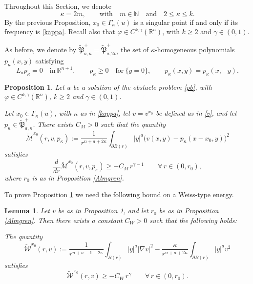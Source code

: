 \documentclass[11pt]{amsart}
\theoremstyle{plain}
\newtheorem{lemma}[thrm]{Lemma}
\newtheorem{prop}[thrm]{Proposition}
\numberwithin{equation}{section}
\begin{document}
Throughout this Section, we denote
\begin{equation}\label{kappa}
\kappa=2m,\qquad \textrm{with}\quad m\in \mathbb N \quad \textrm{and}\quad 2\leq \kappa\leq k.
\end{equation}
By the previous Proposition, $x_0\in\Gamma_\kappa(u)$ is a singular point if and only if its frequency is \eqref{kappa}.
Recall also that $\varphi\in C^{k,\gamma}({\mathbb R}^n)$, with $k\geq2$ and $\gamma\in(0,1)$.

As before, we denote by $\tilde{\mathfrak P}_{a,\kappa}^+=\tilde{\mathfrak P}_{a,2m}^+$ the set of $\kappa$-homogeneous polynomials $p_\kappa(x,y)$ satisfying
\[L_ap_\kappa=0\quad \textrm{in}\ {\mathbb R}^{n+1},\qquad p_\kappa\geq0\quad \textrm{for}\ \{y=0\},\qquad p_\kappa(x,y)=p_\kappa(x,-y).\]

\begin{prop}\label{monneau}
Let $u$ be a solution of the obstacle problem \eqref{pb}, with $\varphi\in C^{k,\gamma}({\mathbb R}^n)$,  $k\geq2$ and $\gamma\in(0,1)$.

Let $x_0\in \Gamma_\kappa(u)$, with $\kappa$ as in \eqref{kappa}, let $v=v^{x_0}$ be defined as in \eqref{v}, and let $p_\kappa\in \tilde{\mathfrak P}_{a,\kappa}^+$.
There exists $C_M>0$ such that the quantity
\[\tilde{\mathcal{M}}^{x_0}(r,v, p_\kappa):=\frac{1}{r^{n+a+2\kappa}}\int_{\partial {B(r)}}|y|^{a}\bigl(v(x,y)-p_\kappa(x-x_0,y)\bigr)^2\]
satisfies
\[\frac{d}{dr}\tilde{\mathcal{M}}^{x_0}(r,v, p_\kappa)\geq -C_M\,r^{\gamma-1}\qquad \forall\,r \in (0,r_0),\]
where $r_0$ is as in Proposition \ref{Almgren}.
\end{prop}

To prove Proposition \ref{monneau} we need the following bound on a Weiss-type energy.

\begin{lemma}\label{weiss}
Let $v$ be as in Proposition \ref{monneau}, and let $r_0$ be as in Proposition \ref{Almgren}.
Then there exists a constant $C_W>0$ such that the following holds:

The quantity
\[\tilde{\mathcal{W}}^{x_0}(r,v):=\frac{1}{r^{n+a-1+2\kappa}}\int_{B(r)}|y|^{a}|\nabla v|^2 -\frac{\kappa}{r^{n+a+2\kappa}}\int_{\partial {B(r)}}|y|^{a}v^2\]
satisfies
\begin{equation}\label{ineq-weiss}
\tilde{\mathcal{W}}^{x_0}(r,v)\geq -C_W\,r^{\gamma}\qquad \forall\, r \in (0,r_0).
\end{equation}
\end{lemma}
\end{document}
